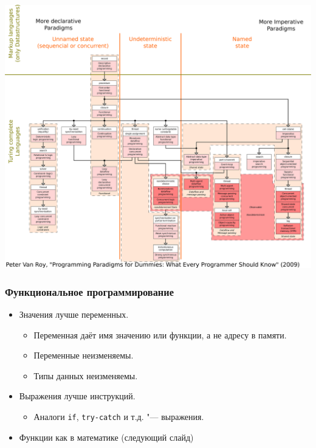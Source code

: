 \documentclass[10pt]{beamer}
\begin{document}
\begin{frame}
\includegraphics[scale=0.13]{lecture1_programming_paradigms.eps}
\end{frame}

\begin{frame}
\frametitle{Функциональное программирование}
\begin{itemize}
    \item Значения лучше переменных.
    \begin{itemize}
        \item Переменная даёт имя значению или функции, а не адресу в памяти.
        \item Переменные неизменяемы.
        \item Типы данных неизменяемы.
    \end{itemize}
    \item Выражения лучше инструкций.
    \begin{itemize}
        \item Аналоги \lstinline|if|, \lstinline|try-catch| и т.д. "--- выражения.
    \end{itemize}
    \item Функции как в математике (следующий слайд)
\end{itemize}
\end{frame}
\end{document}
